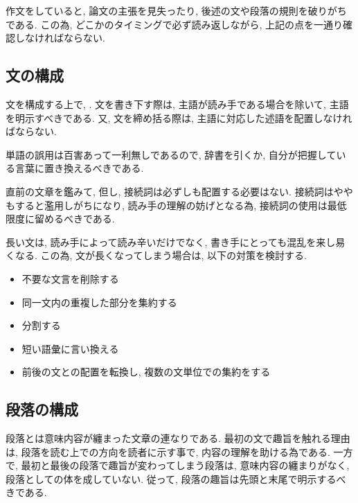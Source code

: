 \documentclass[12pt,xelatex,ja=standard]{bxjsarticle}
\begin{document}
作文をしていると,
論文の主張を見失ったり,
後述の文や段落の規則を破りがちである.
この為, どこかのタイミングで必ず読み返しながら,
上記の点を一通り確認しなければならない.

\subsection{文の構成}
文を構成する上で,
.
文を書き下す際は, 主語が読み手である場合を除いて,
主語を明示すべきである.
又, 文を締め括る際は,
主語に対応した述語を配置しなければならない.

単語の誤用は百害あって一利無しであるので,
辞書を引くか, 自分が把握している言葉に置き換えるべきである.

直前の文章を鑑みて,
但し, 接続詞は必ずしも配置する必要はない.
接続詞はややもすると濫用しがちになり,
読み手の理解の妨げとなる為,
接続詞の使用は最低限度に留めるべきである.

長い文は, 読み手によって読み辛いだけでなく,
書き手にとっても混乱を来し易くなる.
この為,
文が長くなってしまう場合は, 以下の対策を検討する.
\begin{itemize}
\item 不要な文言を削除する
\item 同一文内の重複した部分を集約する
\item 分割する
\item 短い語彙に言い換える
\item 前後の文との配置を転換し, 複数の文単位での集約をする
\end{itemize}

\subsection{段落の構成}
段落とは意味内容が纏まった文章の連なりである.
最初の文で趣旨を触れる理由は,
段落を読む上での方向を読者に示す事で,
内容の理解を助ける為である.
一方で, 最初と最後の段落で趣旨が変わってしまう段落は,
意味内容の纏まりがなく,
段落としての体を成していない.
従って, 段落の趣旨は先頭と末尾で明示するべきである.
\end{document}
